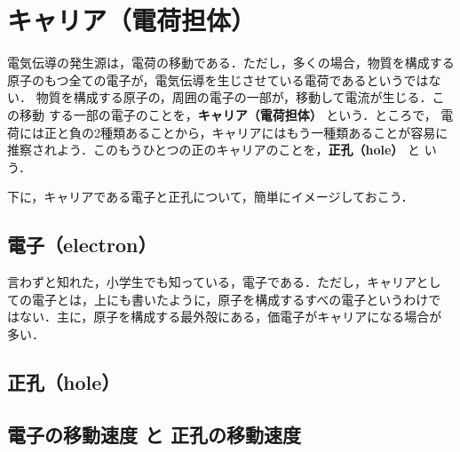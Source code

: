     \section{キャリア（電荷担体）}
        電気伝導の発生源は，電荷の移動である．ただし，多くの場合，物質を構成する
        原子のもつ全ての電子が，電気伝導を生じさせている電荷であるというではない．
        物質を構成する原子の，周囲の電子の一部が，移動して電流が生じる．この移動
        する一部の電子のことを，\textbf{キャリア（電荷担体）} という．ところで，
        電荷には正と負の2種類あることから，キャリアにはもう一種類あることが容易に
        推察されよう．このもうひとつの正のキャリアのことを，\textbf{正孔（hole）} と
        いう．

        下に，キャリアである電子と正孔について，簡単にイメージしておこう．

        \subsection{電子（electron）}
            言わずと知れた，小学生でも知っている，電子である．ただし，キャリアとし
            ての電子とは，上にも書いたように，原子を構成するすべの電子というわけで
            はない．主に，原子を構成する最外殻にある，価電子がキャリアになる場合が
            多い．

        \subsection{正孔（hole）}

        \subsection{電子の移動速度 と 正孔の移動速度}

